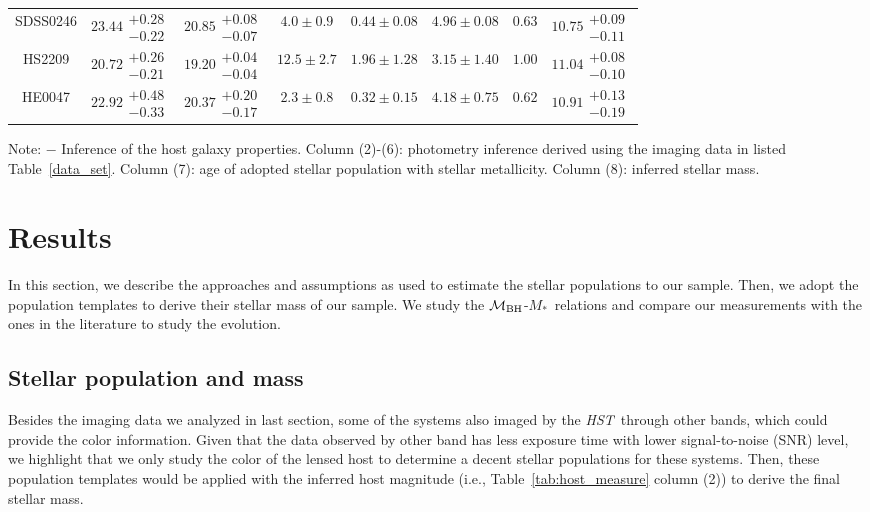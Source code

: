 \documentclass[fleqn,usenatbib]{mnras}
\newcommand{\hst}{{\it HST}}
\newcommand{\mbh}{$\mathcal M_{\rm BH}$}
\newcommand{\mstar}{{$M_*$}}
\begin{document}
\begin{table}
\begin{threeparttable}
\begin{tabular}{cccccccc}
SDSS0246 & $23.44\substack{+0.28\\-0.22}$ & $20.85\substack{+0.08\\-0.07}$ & $4.0\pm0.9$ & $0.44\pm0.08$ & $4.96\pm0.08$ & $0.63$ & $10.75\substack{+0.09\\-0.11}$ \\
HS2209 & $20.72\substack{+0.26\\-0.21}$ & $19.20\substack{+0.04\\-0.04}$ & $12.5\pm2.7$ & $1.96\pm1.28$ & $3.15\pm1.40$ & $1.00$ & $11.04\substack{+0.08\\-0.10}$ \\
HE0047 & $22.92\substack{+0.48\\-0.33}$ & $20.37\substack{+0.20\\-0.17}$ & $2.3\pm0.8$ & $0.32\pm0.15$ & $4.18\pm0.75$ & $0.62$ & $10.91\substack{+0.13\\-0.19}$ \\
\hline
\end{tabular}
\begin{tablenotes}
      \small
      \item Note: $-$ Inference of the host galaxy properties. Column (2)-(6): photometry inference derived using the imaging data in listed Table~\ref{data_set}. Column (7): age of adopted stellar population with stellar metallicity. Column (8): inferred stellar mass. 
\end{tablenotes}    
\end{threeparttable}
\end{table}


\section{Results}\label{sec:result}
In this section, we describe the approaches and assumptions as used to estimate the stellar populations to our sample. Then, we adopt the population templates to derive their stellar mass of our sample. We study the \mbh-\mstar\ relations and compare our measurements with the ones in the literature to study the evolution.

\subsection{Stellar population and mass}\label{sec:mstar}
Besides the imaging data we analyzed in last section, some of the systems also imaged by the \hst\ through other bands, which could provide the color information. Given that the data observed by other band has less exposure time with lower signal-to-noise (SNR) level, we highlight that we only study the color of the lensed host to determine a decent stellar populations for these systems. Then, these population templates would be applied with the inferred host magnitude (i.e., Table~\ref{tab:host_measure} column (2)) to derive the final stellar mass.
\end{document}
